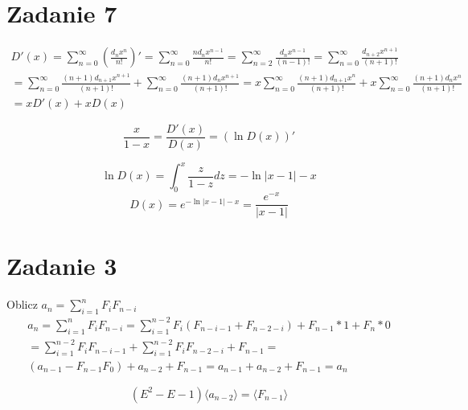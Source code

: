 \documentclass{article}
\begin{document}
\section*{Zadanie 7}
\begin{equation}
    \begin{split}
        D'(x) = \sum^{\infty}_{n=0} (\frac{d_n x^n}{n!})' = \sum^{\infty}_{n=0} \frac{n d_n x^{n-1}}{n!} = \sum^{\infty}_{n=2} \frac{d_n x^{n-1}}{(n-1)!} = \sum^{\infty}_{n=0} \frac{d_{n+2} x^{n+1}}{(n+1)!} \\
        = \sum^{\infty}_{n=0} \frac{(n+1) d_{n+1} x^{n+1}}{(n+1)!} + \sum^{\infty}_{n=0} \frac{(n+1) d_{n} x^{n+1}}{(n+1)!} = x \sum^{\infty}_{n=0} \frac{(n+1) d_{n+1} x^{n}}{(n+1)!} + x \sum^{\infty}_{n=0} \frac{(n+1) d_{n} x^{n}}{(n+1)!} \\ = x D'(x) + xD(x)
    \end{split}
\end{equation}

\[
  \frac{x}{1-x} = \frac{D'(x)}{D(x)} = (\ln D(x))'  
\]

\[
 \ln D(x) = \int^{x}_0 \frac{z}{1-z} dz  = - \ln |x-1| - x
\]
\[
 D(x) = e^{- \ln |x-1| -x} = \frac{e^{-x}}{|x-1|}   
\]

\section*{Zadanie 3}
Oblicz $a_n = \sum^n_{i=1}F_i F_{n-i}$
\begin{equation}
    \begin{split}
        a_n = \sum^n_{i=1}F_i F_{n-i} = \sum^{n-2}_{i=1}F_i (F_{n-i-1} + F_{n-2-i}) + F_{n-1} * 1 + F_n * 0 \\ = \sum^{n-2}_{i=1}F_i F_{n-i-1} + \sum^{n-2}_{i=1}F_i F_{n-2-i} + F_{n-1} = \\ (a_{n-1} - F_{n-1} F_0) + a_{n-2} + F_{n-1} =
        a_{n-1} + a_{n-2} + F_{n-1} = a_n
    \end{split}
\end{equation}

\[
  (E^2 - E - 1) \langle a_{n-2} \rangle = \langle F_{n-1} \rangle  
\]
\end{document}
